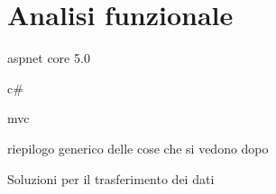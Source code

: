 \section{Analisi funzionale}
aspnet core 5.0 

c\#

mvc

riepilogo generico delle cose che si vedono dopo

Soluzioni per il trasferimento dei dati